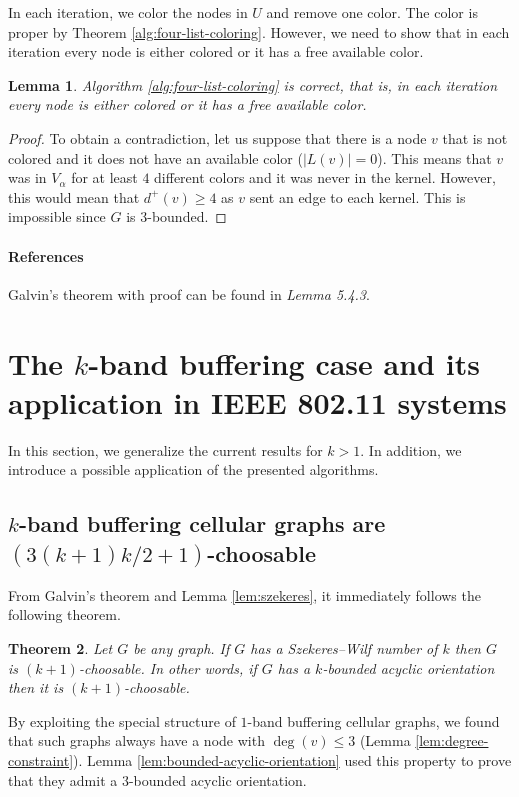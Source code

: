\documentclass[a4paper, 12pt]{article}
\newtheorem{lem}{Lemma}[section]
\newtheorem{theo}[lem]{Theorem}
\begin{document}
In each iteration, we color the nodes in $U$ and remove one color. The color is proper by Theorem \ref{alg:four-list-coloring}. However, we need to show that in each iteration every node is either colored or it has a free available color.
\begin{lem} Algorithm \ref{alg:four-list-coloring} is correct, that is, in each iteration every node is either colored or it has a free available color.
\end{lem}
\begin{proof} To obtain a contradiction, let us suppose that there is a node $v$ that is not colored and it does not have an available color ($|L(v)|=0$). This means that $v$ was in $V_{\alpha}$ for at least $4$ different colors and it was never in the kernel. However, this would mean that $d^+(v) \geqslant 4$ as $v$ sent an edge to each kernel. This is impossible since $G$ is $3$-bounded.
\end{proof}

\paragraph*{References} Galvin's theorem with proof can be found in \cite{citeulike:395714} \textit{Lemma 5.4.3}.

\section{The $k$-band buffering case and its application in IEEE 802.11 systems}\label{sec:k-band-case}
In this section, we generalize the current results for $k > 1$. In addition, we introduce a possible application of the presented algorithms.

\subsection{$k$-band buffering cellular graphs are $(3(k+1)k/2+1)$-choosable}
From Galvin's theorem and Lemma \ref{lem:szekeres}, it immediately follows the following theorem.
\begin{theo} Let $G$ be any graph. If $G$ has a Szekeres\---Wilf number of $k$ then $G$ is $(k+1)$-choosable. In other words, if $G$ has a $k$-bounded acyclic orientation then it is $(k+1)$-choosable.
\end{theo}

By exploiting the special structure of $1$-band buffering cellular graphs, we found that such graphs always have a node with $\deg(v) \leqslant 3$ (Lemma \ref{lem:degree-constraint}). Lemma \ref{lem:bounded-acyclic-orientation} used this property to prove that they admit a $3$-bounded acyclic orientation.
\end{document}
